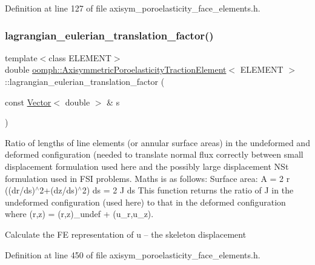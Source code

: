 Definition at line 127 of file axisym\+\_\+poroelasticity\+\_\+face\+\_\+elements.\+h.

\mbox{\label{classoomph_1_1AxisymmetricPoroelasticityTractionElement_a74bcc2448d472585579da00fb1a79da7}} 
\subsubsection{\texorpdfstring{lagrangian\+\_\+eulerian\+\_\+translation\+\_\+factor()}{lagrangian\_eulerian\_translation\_factor()}}
{\footnotesize\ttfamily template$<$class E\+L\+E\+M\+E\+NT$>$ \\
double \hyperlink{classoomph_1_1AxisymmetricPoroelasticityTractionElement}{oomph\+::\+Axisymmetric\+Poroelasticity\+Traction\+Element}$<$ E\+L\+E\+M\+E\+NT $>$\+::lagrangian\+\_\+eulerian\+\_\+translation\+\_\+factor (\begin{DoxyParamCaption}\item[{const \hyperlink{classoomph_1_1Vector}{Vector}$<$ double $>$ \&}]{s }\end{DoxyParamCaption})\hspace{0.3cm}{\ttfamily [inline]}}



Ratio of lengths of line elements (or annular surface areas) in the undeformed and deformed configuration (needed to translate normal flux correctly between small displacement formulation used here and the possibly large displacement N\+St formulation used in F\+SI problems. Maths is as follows\+: Surface area\+: A = 2   r ((dr/ds)$^\wedge$2+(dz/ds)$^\wedge$2) ds = 2   J ds This function returns the ratio of J in the undeformed configuration (used here) to that in the deformed configuration where (r,z) = (r,z)\+\_\+undef + (u\+\_\+r,u\+\_\+z). 

Calculate the FE representation of u -- the skeleton displacement 

Definition at line 450 of file axisym\+\_\+poroelasticity\+\_\+face\+\_\+elements.\+h.

